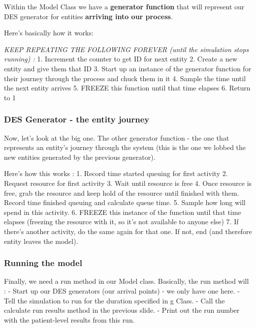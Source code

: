 \documentclass[
  letterpaper,
  DIV=11,
  numbers=noendperiod]{scrreprt}
\begin{document}
Within the Model Class we have a \textbf{generator function} that will
represent our DES generator for entities \textbf{arriving into our
process}.

Here's basically how it works:

\emph{KEEP REPEATING THE FOLLOWING FOREVER (until the simulation stops
running) :} 1. Increment the counter to get ID for next entity 2. Create
a new entity and give them that ID 3. Start up an instance of the
generator function for their journey through the process and chuck them
in it 4. Sample the time until the next entity arrives 5. FREEZE this
function until that time elapses 6. Return to 1

\subsubsection{DES Generator - the entity
journey}\label{des-generator---the-entity-journey}

Now, let's look at the big one. The other generator function - the one
that represents an entity's journey through the system (this is the one
we lobbed the new entities generated by the previous generator).

Here's how this works : 1. Record time started queuing for first
activity 2. Request resource for first activity 3. Wait until resource
is free 4. Once resource is free, grab the resource and keep hold of the
resource until finished with them. Record time finished queuing and
calculate queue time. 5. Sample how long will spend in this activity. 6.
FREEZE this instance of the function until that time elapses (freezing
the resource with it, so it's not available to anyone else) 7. If
there's another activity, do the same again for that one. If not, end
(and therefore entity leaves the model).

\subsubsection{Running the model}\label{running-the-model}

Finally, we need a run method in our Model class. Basically, the run
method will : - Start up our DES generators (our arrival points) - we
only have one here. - Tell the simulation to run for the duration
specified in g Class. - Call the calculate run results method in the
previous slide. - Print out the run number with the patient-level
results from this run.
\end{document}
